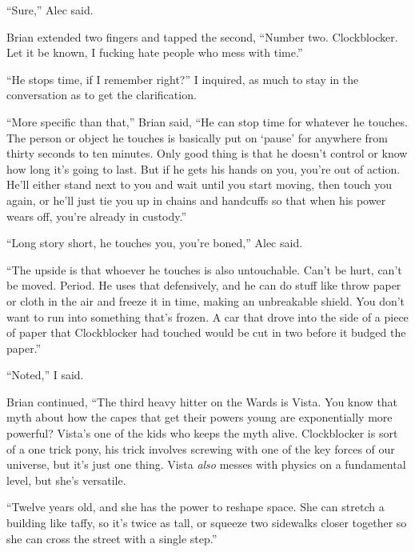 ``Sure,'' Alec said.



Brian extended two fingers and tapped the second, ``Number two.  Clockblocker.  Let it be known, I fucking hate people who mess with time.''



``He stops time, if I remember right?'' I inquired, as much to stay in the conversation as to get the clarification.



``More specific than that,'' Brian said, ``He can stop time for whatever he touches.  The person or object he touches is basically put on `pause' for anywhere from thirty seconds to ten minutes.  Only good thing is that he doesn't control or know how long it's going to last.  But if he gets his hands on you, you're out of action.  He'll either stand next to you and wait until you start moving, then touch you again, or he'll just tie you up in chains and handcuffs so that when his power wears off, you're already in custody.''



``Long story short, he touches you, you're boned,'' Alec said.



``The upside is that whoever he touches is also untouchable.  Can't be hurt, can't be moved.  Period.  He uses that defensively, and he can do stuff like throw paper or cloth in the air and freeze it in time, making an unbreakable shield.  You don't want to run into something that's frozen.  A car that drove into the side of a piece of paper that Clockblocker had touched would be cut in two before it budged the paper.''



``Noted,'' I said.



Brian continued, ``The third heavy hitter on the Wards is Vista.  You know that myth about how the capes that get their powers young are exponentially more powerful?  Vista's one of the kids who keeps the myth alive.  Clockblocker is sort of a one trick pony, his trick involves screwing with one of the key forces of our universe, but it's just one thing.  Vista \emph{also} messes with physics on a fundamental level, but she's versatile.



``Twelve years old, and she has the power to reshape space.  She can stretch a building like taffy, so it's twice as tall, or squeeze two sidewalks closer together so she can cross the street with a single step.''



